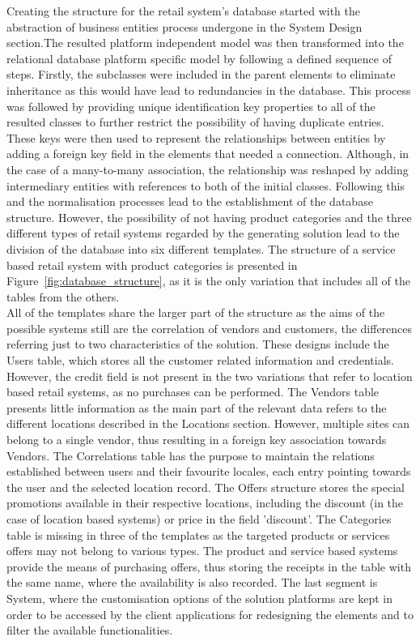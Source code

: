 Creating the structure for the retail system's database started with the abstraction of business entities process undergone in the System Design section.The resulted platform independent model was then transformed into the relational database platform specific model by following a defined sequence of steps. Firstly, the subclasses were included in the parent elements to eliminate inheritance as this would have lead to redundancies in the database. This process was followed by providing unique identification key properties to all of the resulted classes to further restrict the possibility of having duplicate entries. These keys were then used to represent the relationships between entities by adding a foreign key field in the elements that needed a connection. Although, in the case of a many-to-many association, the relationship was reshaped by adding intermediary entities with references to both of the initial classes. Following this and the normalisation processes lead to the establishment of the database structure. However, the possibility of not having product categories and the three different types of retail systems regarded by the generating solution lead to the division of the database into six different templates. The structure of a service based retail system with product categories is presented in Figure~\ref{fig:database_structure}, as it is the only variation that includes all of the tables from the others.\\

All of the templates share the larger part of the structure as the aims of the possible systems still are the correlation of vendors and customers, the differences referring just to two characteristics of the solution. These designs include the Users table, which stores all the customer related information and credentials. However, the credit field is not present in the two variations that refer to location based retail systems, as no purchases can be performed. The Vendors table presents little information as the main part of the relevant data refers to the different locations described in the Locations section. However, multiple sites can belong to a single vendor, thus resulting in a foreign key association towards Vendors. The Correlations table has the purpose to maintain the relations established between users and their favourite locales, each entry pointing towards the user and the selected location record. The Offers structure stores the special promotions available in their respective locations, including the discount (in the case of location based systems) or price in the field 'discount'. The Categories table is missing in three of the templates as the targeted products or services offers may not belong to various types. The product and service based systems provide the means of purchasing offers, thus storing the receipts in the table with the same name, where the availability is also recorded. The last segment is System, where the customisation options of the solution platforms are kept in order to be accessed by the client applications for redesigning the elements and to filter the available functionalities.\\

